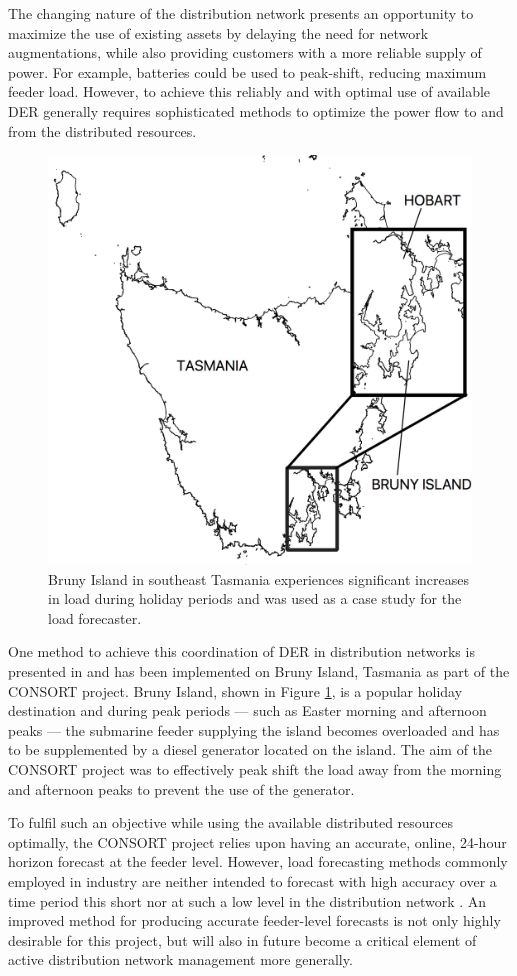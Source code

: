 \documentclass[conference]{IEEEtran}
\begin{document}
The changing nature of the distribution network presents an opportunity to maximize the use of existing assets by delaying the need for network augmentations, while also providing customers with a more reliable supply of power.
For example, batteries could be used to peak-shift, reducing maximum feeder load.
However, to achieve this reliably and with optimal use of available DER generally requires sophisticated methods to optimize the power flow to and from the distributed resources.

\begin{figure}[htbp]
	\centerline{\includegraphics[width=.35\textwidth]{images/bruny_island_map.png}}
	\caption{Bruny Island in southeast Tasmania experiences significant increases in load during holiday periods and was used as a case study for the load forecaster.}
	\label{fig:bruny_map}
\end{figure}

One method to achieve this coordination of DER in distribution networks is presented in \cite{Scott2014} and has been implemented on Bruny Island, Tasmania as part of the CONSORT project.
Bruny Island, shown in Figure \ref{fig:bruny_map}, is a popular holiday destination and during peak periods --- such as Easter morning and afternoon peaks --- the submarine feeder supplying the island becomes overloaded and has to be supplemented by a diesel generator located on the island.
The aim of the CONSORT project was to effectively peak shift the load away from the morning and afternoon peaks to prevent the use of the generator.

To fulfil such an objective while using the available distributed resources optimally, the CONSORT project relies upon having an accurate, online, 24-hour horizon forecast at the feeder level.
However, load forecasting methods commonly employed in industry are neither intended to forecast with high accuracy over a time period this short nor at such a low level in the distribution network \cite{CIGRE2016}.
An improved method for producing accurate feeder-level forecasts is not only highly desirable for this project, but will also in future become a critical element of active distribution network management more generally.
\end{document}
